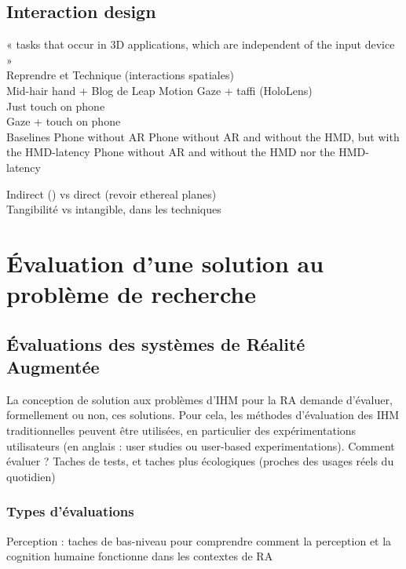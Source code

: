 \subsection{Interaction design}
      « tasks that occur in 3D applications, which are independent of the input device » \cite{JankowskiHachet2013}\\
      Reprendre \cite{Bernatchez2008} et \cite{JankowskiHachet2013}
      Technique (interactions spatiales)\\
            Mid-hair hand \cite{EnsFinneganIrani2014} \cite{ChanKaoChenEtAl2010} \cite{JonesSodhiForsythEtAl2012} + Blog de Leap Motion
            Gaze + taffi (HoloLens)\\
            Just touch on phone\\
            Gaze + touch on phone\\
            Baselines
              Phone without AR
              Phone without AR and without the HMD, but with the HMD-latency
              Phone without AR and without the HMD nor the HMD-latency

        Indirect (\cite{TeatherStuerzlinger2011}) vs direct (revoir ethereal planes)\\
        Tangibilité vs intangible, dans les techniques\\



\section{Évaluation d'une solution au problème de recherche}
\subsection{Évaluations des systèmes de Réalité Augmentée}
La conception de solution aux problèmes d'IHM pour la RA demande d'évaluer, formellement ou non, ces solutions. Pour cela, les méthodes d'évaluation des IHM traditionnelles peuvent être utilisées, en particulier des expérimentations utilisateurs (en anglais : \foreignlanguage{english}{user studies} ou \foreignlanguage{english}{user-based experimentations}). \citep{SwanGabbard2005}
Comment évaluer ? Taches de tests, et taches plus écologiques (proches des usages réels du quotidien) \cite{DeSaChurchill2013}
\cite{SwanGabbard2005} \cite{DuenserGrassetBillinghurst2008}

\subsubsection{Types d'évaluations}
Perception : taches de bas-niveau pour comprendre comment la perception et la cognition humaine fonctionne dans les contextes de RA

